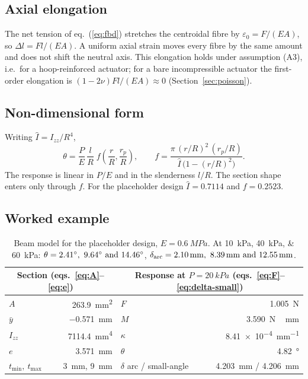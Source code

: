 \documentclass[11pt,a4paper]{article}
\numberwithin{equation}{section}
\newcommand{\Izz}{I_{zz}}
\newcommand{\rp}{r_p}
\newcommand{\tmin}{t_{\min}}
\newcommand{\tmax}{t_{\max}}
\begin{document}
\subsection{Axial elongation}
The net tension of eq.~(\ref{eq:fbd}) stretches the centroidal fibre by $\varepsilon_0 = F/(EA)$, so $\Delta l = Fl/(EA)$.
A uniform axial strain moves every fibre by the same amount and does not shift the neutral axis.
This elongation holds under assumption (A3), i.e.\ for a hoop-reinforced actuator; for a bare incompressible actuator the first-order
elongation is $(1-2\nu)Fl/(EA)\approx 0$ (Section~\ref{sec:poisson}).

\subsection{Non-dimensional form}
Writing $\hat I = \Izz/R^4$,
\begin{equation}
\theta = \frac{P}{E}\,\frac{l}{R}\; f\!\left(\frac{r}{R},\frac{\rp}{R}\right),\qquad
f = \frac{\pi\,(r/R)^2\,(\rp/R)}{\hat I\,\big(1-(r/R)^2\big)} .
\end{equation}
The response is linear in $P/E$ and in the slenderness $l/R$. The section shape enters only through $f$.
For the placeholder design $\hat I = 0.7114$ and $f = 0.2523$.

\subsection{Worked example}
\begin{table}[H]
\centering\small
\begin{tabular}{@{}lr@{\qquad}lr@{}}
\toprule
\multicolumn{2}{c}{Section (eqs.~\ref{eq:A}--\ref{eq:e})} & \multicolumn{2}{c}{Response at $P=\SI{20}{kPa}$ (eqs.~\ref{eq:F}--\ref{eq:delta-small})}\\
\midrule
$A$ & \SI{263.9}{mm^2} & $F$ & \SI{1.005}{N}\\
$\bar y$ & \SI{-0.571}{mm} & $M$ & \SI{3.590}{N\,mm}\\
$\Izz$ & \SI{7114.4}{mm^4} & $\kappa$ & \SI{8.41e-4}{mm^{-1}}\\
$e$ & \SI{3.571}{mm} & $\theta$ & \SI{4.82}{\degree}\\
$\tmin,\ \tmax$ & \SI{3}{mm}, \SI{9}{mm} & $\delta$ arc / small-angle & \SI{4.203}{mm} / \SI{4.206}{mm}\\
\bottomrule
\end{tabular}
\caption{Beam model for the placeholder design, $E=\SI{0.6}{MPa}$. At \SIlist{10;40;60}{kPa}: $\theta = \SIlist{2.41;9.64;14.46}{\degree}$, $\delta_{\text{arc}} = \SIlist{2.10;8.39;12.55}{mm}$.}
\label{tab:example}
\end{table}
\end{document}
